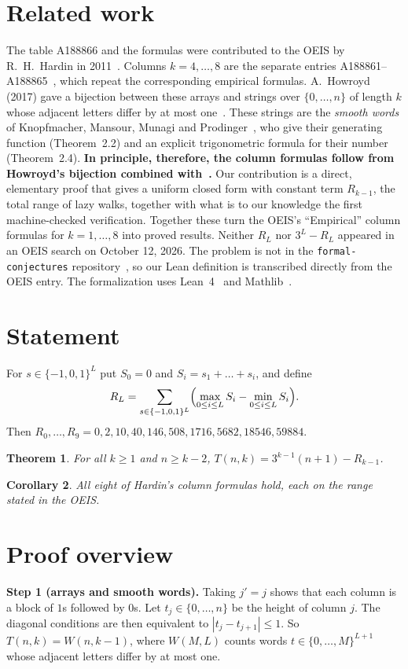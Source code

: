 \documentclass[11pt]{article}
\newtheorem{theorem}{Theorem}
\newtheorem{corollary}[theorem]{Corollary}
\theoremstyle{remark}\newtheorem{remark}[theorem]{Remark}
\begin{document}
\section{Related work}
The table A188866 and the formulas were contributed to the OEIS by R.~H.~Hardin in 2011~\cite{oeis}. Columns $k=4,\dots,8$ are the separate entries A188861--A188865~\cite{oeiscols}, which repeat the corresponding empirical formulas. A.~Howroyd (2017) gave a bijection between these arrays and strings over $\{0,\dots,n\}$ of length $k$ whose adjacent letters differ by at most one~\cite{howroyd}. These strings are the \emph{smooth words} of Knopfmacher, Mansour, Munagi and Prodinger~\cite{kmmp}, who give their generating function (Theorem~2.2) and an explicit trigonometric formula for their number (Theorem~2.4). \textbf{In principle, therefore, the column formulas follow from Howroyd's bijection combined with~\cite{kmmp}.} Our contribution is a direct, elementary proof that gives a uniform closed form with constant term $R_{k-1}$, the total range of lazy walks, together with what is to our knowledge the first machine-checked verification. Together these turn the OEIS's ``Empirical'' column formulas for $k=1,\dots,8$ into proved results. Neither $R_L$ nor $3^L-R_L$ appeared in an OEIS search on October 12, 2026. The problem is not in the \texttt{formal-conjectures} repository~\cite{fc}, so our Lean definition is transcribed directly from the OEIS entry. The formalization uses Lean~4~\cite{lean4} and Mathlib~\cite{mathlib}.

\section{Statement}
For $s\in\{-1,0,1\}^L$ put $S_0=0$ and $S_i=s_1+\dots+s_i$, and define
\[
R_L=\sum_{s\in\{-1,0,1\}^L}\Bigl(\max_{0\le i\le L}S_i-\min_{0\le i\le L}S_i\Bigr).
\]
Then $R_0,\dots,R_9=0,2,10,40,146,508,1716,5682,18546,59884$.
\begin{theorem}\label{thm:main}
For all $k\ge1$ and $n\ge k-2$, $T(n,k)=3^{k-1}(n+1)-R_{k-1}$.
\end{theorem}
\begin{corollary}\label{cor:cols}
All eight of Hardin's column formulas hold, each on the range stated in the OEIS.
\end{corollary}

\section{Proof overview}
\textbf{Step 1 (arrays and smooth words).} Taking $j'=j$ shows that each column is a block of $1$s followed by $0$s. Let $t_j\in\{0,\dots,n\}$ be the height of column $j$. The diagonal conditions are then equivalent to $|t_j-t_{j+1}|\le1$. So $T(n,k)=W(n,k-1)$, where $W(M,L)$ counts words $t\in\{0,\dots,M\}^{L+1}$ whose adjacent letters differ by at most one.
\end{document}
